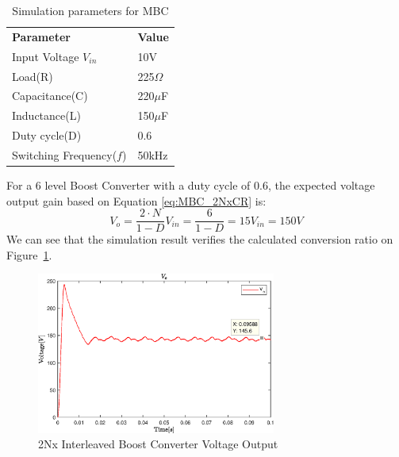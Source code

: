 \begin{table}[H]
\begin{center}
\caption {Simulation parameters for MBC} \label{tab:MBC_2Nx} 
\begin{tabular}{|l|l|}
\cline{1-2}
\textbf{Parameter} & \textbf{Value}  \\ \cline{1-2}
Input Voltage $V_{in}$          &      10V   \\ \cline{1-2}
Load(R)   & 225$\Omega$           \\ \cline{1-2}
Capacitance(C)          &       220$\mu$F     \\ \cline{1-2}
Inductance(L)          &      150$\mu$F      \\ \cline{1-2}
Duty cycle(D)          &     0.6       \\ \cline{1-2}
Switching Frequency($f$)          &      50kHz      \\ \cline{1-2}
\end{tabular}
\end{center}
\end{table} 
\vspace{-8mm}
For a 6 level Boost Converter with a duty cycle of 0.6, the expected voltage output gain based on Equation \ref{eq:MBC_2NxCR} is:
\begin{equation}
	V_o = \frac{2\cdot N}{1-D}V_{in} = \frac{6}{1-D}  = 15V_{in}=150V
\end{equation}
We can see that the simulation result verifies the calculated conversion ratio on Figure~\ref{fig:MBC_2NxSimResult}.\\
\vspace{-8mm}
\begin{figure}[H]
   \centering
   \includegraphics[width=0.7\textwidth]{figures/yy2NxMultilevelBC/2Nx_SimResults.eps}
    \caption{2Nx Interleaved Boost Converter Voltage Output}
	\label{fig:MBC_2NxSimResult}
\end{figure}
\clearpage

